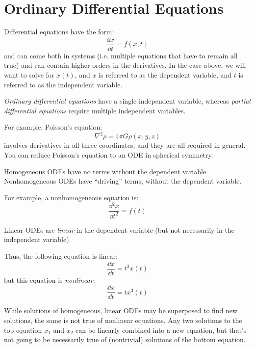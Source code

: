 \section{Ordinary Differential Equations}

Differential equations have the form:
\begin{equation}
\frac{\dd{x}}{\dd{t}} = f(x, t)
\end{equation}
and can come both in systems (i.e. multiple equations that have to
remain all true) and can contain higher orders in the derivatives. 
In the case above, we will want to solve for $x(t)$, and $x$ is
referred to as the dependent variable, and $t$ is referred to as the
independent variable. 


\begin{answer}
{\it Ordinary differential equations} have a single independent
variable, whereas {\it partial differential equations} require
multiple independent variables. 

For example, Poisson's equation:
\begin{equation}
\nabla^2 \rho = 4 \pi G \rho(x,y,z)
\end{equation}
involves derivatives in all three coordinates, and they are all
required in general. You can reduce Poisson's equation to an ODE in
spherical symmetry.
\end{answer}


\begin{answer}
Homogeneous ODEs have  no terms without the dependent variable.
Nonhomogeneous ODEs have ``driving'' terms, without the dependent
variable.

For example, a nonhomogeneous equation is:
\begin{equation}
\frac{\dd{^2x}}{\dd{t^2}} = f(t)
\end{equation}
\end{answer}


\begin{answer}
Linear ODEs are {\it linear} in the dependent variable (but not necessarily
in the independent variable). 

Thus, the following equation is linear:
\begin{equation}
\frac{\dd{x}}{\dd{t}} = t^3 x(t)
\end{equation}
but this equation is {\it nonlinear}:
\begin{equation}
\frac{\dd{x}}{\dd{t}} = t x^3(t)
\end{equation}

While solutions of homogeneous, linear ODEs may be superposed to find
new solutions, the same is not true of nonlinear equations.  Any two
solutions to the top equation $x_1$ and $x_2$ can be linearly combined
into a new equation, but that's not going to be necessarily true of
(nontrivial) solutions of the bottom equation.
\end{answer}

